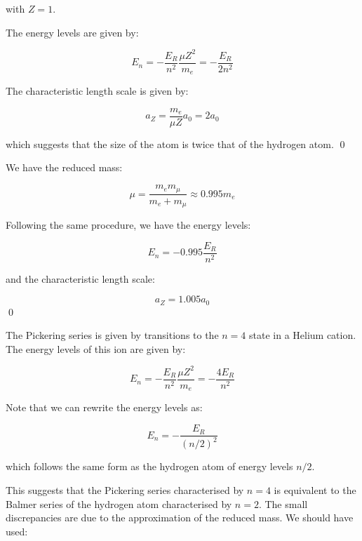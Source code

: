 \documentclass[12pt]{article}
\begin{document}
with $Z = 1$.

The energy levels are given by:

\begin{equation}
    E_{n} = - \frac{E_{R}}{n^{2}} \frac{\mu Z^{2}}{m_{e}} = - \frac{E_{R}}{2n^{2}}
\end{equation}

The characteristic length scale is given by:

\begin{equation}
    a_{Z} = \frac{m_{e}}{\mu Z} a_{0} = 2 a_{0}
\end{equation}

which suggests that the size of the atom is twice that of the hydrogen atom.
\qed


We have the reduced mass:

\begin{equation}
    \mu = \frac{m_{e} m_{\mu}}{m_{e} + m_{\mu}} \approx 0.995 m_{e}
\end{equation}

Following the same procedure, we have the energy levels:

\begin{equation}
    E_{n} = -0.995 \frac{E_{R}}{n^{2}}
\end{equation}

and the characteristic length scale:

\begin{equation}
    a_{Z} = 1.005 a_{0}
\end{equation}
\qed


The Pickering series is given by transitions to the $n = 4$ state in a Helium cation. The energy levels of this ion are given by:

\begin{equation}
    E_{n} = -\frac{E_{R}}{n^{2}} \frac{\mu Z^{2}}{m_{e}} = -\frac{4E_{R}}{n^{2}}
\end{equation}

Note that we can rewrite the energy levels as:

\begin{equation}
    E_{n} = -\frac{E_{R}}{(n/2)^{2}}
\end{equation}

which follows the same form as the hydrogen atom of energy levels $n/2$.

This suggests that the Pickering series characterised by $n = 4$ is equivalent to the Balmer series of the hydrogen atom characterised by $n = 2$. The small discrepancies are due to the approximation of the reduced mass. We should have used:
\end{document}
